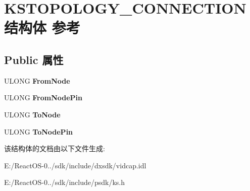 \hypertarget{struct_k_s_t_o_p_o_l_o_g_y___c_o_n_n_e_c_t_i_o_n}{}\section{K\+S\+T\+O\+P\+O\+L\+O\+G\+Y\+\_\+\+C\+O\+N\+N\+E\+C\+T\+I\+O\+N结构体 参考}
\label{struct_k_s_t_o_p_o_l_o_g_y___c_o_n_n_e_c_t_i_o_n}
\subsection*{Public 属性}
\begin{DoxyCompactItemize}
\item 
\mbox{\label{struct_k_s_t_o_p_o_l_o_g_y___c_o_n_n_e_c_t_i_o_n_a75a208d59c66bf845c61558ec1ade1c0}} 
U\+L\+O\+NG {\bfseries From\+Node}
\item 
\mbox{\label{struct_k_s_t_o_p_o_l_o_g_y___c_o_n_n_e_c_t_i_o_n_a9e22f65bb8f2db9b15707ef432f89a59}} 
U\+L\+O\+NG {\bfseries From\+Node\+Pin}
\item 
\mbox{\label{struct_k_s_t_o_p_o_l_o_g_y___c_o_n_n_e_c_t_i_o_n_ab0678397d20a741ce251cc6922f7aacb}} 
U\+L\+O\+NG {\bfseries To\+Node}
\item 
\mbox{\label{struct_k_s_t_o_p_o_l_o_g_y___c_o_n_n_e_c_t_i_o_n_a1ed3b50b7c388036d1eadb89e06d18a1}} 
U\+L\+O\+NG {\bfseries To\+Node\+Pin}
\end{DoxyCompactItemize}


该结构体的文档由以下文件生成\+:\begin{DoxyCompactItemize}
\item 
E\+:/\+React\+O\+S-\/0../sdk/include/dxsdk/vidcap.\+idl\item 
E\+:/\+React\+O\+S-\/0../sdk/include/psdk/ks.\+h\end{DoxyCompactItemize}
